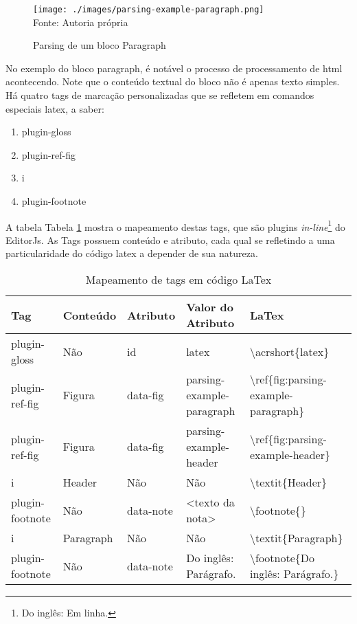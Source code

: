 \begin{figure}[H]
    \centering
    \caption{Parsing de um bloco Paragraph}
    \texttt{[image: ./images/parsing-example-paragraph.png]}
    \label{fig:parsing-example-paragraph} \\
    \textnormal{\fontsize{10pt}{12pt}Fonte: Autoria própria}
\end{figure}

No exemplo do bloco paragraph, é notável o processo de
processamento de
\acrshort{html}
acontecendo. Note que o conteúdo textual do bloco
não é apenas texto simples. Há quatro tags de
marcação personalizadas que se refletem em comandos
especiais
\acrshort{latex}, a saber:

\begin{enumerate}
        
	\item plugin-gloss
	\item plugin-ref-fig
	\item i
	\item plugin-footnote
    
\end{enumerate}

A tabela
Tabela \ref{tbl:plugins-latex-mapping}
mostra o mapeamento destas tags, que são plugins
\textit{in-line}\footnote{Do inglês: Em linha.
}
do EditorJs. As Tags possuem conteúdo e atributo, cada qual se
refletindo a uma particularidade do código
\acrshort{latex}
a depender de sua natureza.

\begin{table}[H]
    \centering
    \caption{Mapeamento de tags em código LaTex}
    \label{tbl:plugins-latex-mapping}
    \renewcommand{\arraystretch}{1.5}
    \begin{tabular}{p{1.9200cm} p{1.9200cm} p{1.9200cm} p{3.2000cm} p{7.0400cm}}
        \hline
        \textbf{Tag} & \textbf{Conteúdo} & \textbf{Atributo} & \textbf{Valor do Atributo} & \textbf{LaTex} \\
        \hline
        plugin-gloss & Não & id & latex & \textbackslash acrshort\{latex\} \\
		plugin-ref-fig & Figura & data-fig & parsing-example-paragraph & \textbackslash ref\{fig:parsing-example-paragraph\} \\
		plugin-ref-fig & Figura & data-fig & parsing-example-header & \textbackslash ref\{fig:parsing-example-header\} \\
		i & Header & Não & Não & \textbackslash textit\{Header\} \\
		plugin-footnote & Não & data-note & <texto da nota> & \textbackslash footnote\{<texto da nota>\} \\
		i & Paragraph & Não & Não & \textbackslash textit\{Paragraph\} \\
		plugin-footnote & Não & data-note & Do inglês: Parágrafo. & \textbackslash footnote\{Do inglês: Parágrafo.\} \\
        \hline
        
    \end{tabular}
\end{table}

